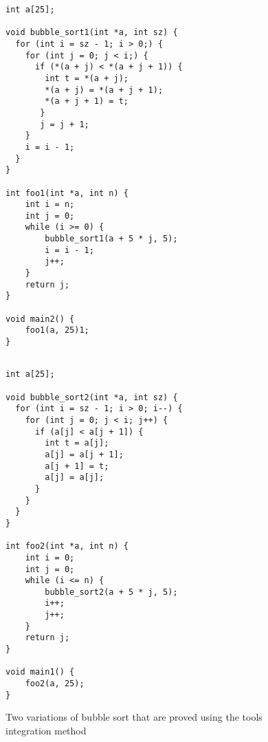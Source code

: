\begin{figure}[h]
\begin{center}
\begin{minipage}{8 cm}


\begin{lstlisting}
int a[25];

void bubble_sort1(int *a, int sz) {
  for (int i = sz - 1; i > 0;) {
    for (int j = 0; j < i;) {
      if (*(a + j) < *(a + j + 1)) {
        int t = *(a + j);
        *(a + j) = *(a + j + 1);
        *(a + j + 1) = t;
       }
       j = j + 1;
    }
    i = i - 1;
  }
}

int foo1(int *a, int n) {
    int i = n;
    int j = 0;
    while (i >= 0) {
        bubble_sort1(a + 5 * j, 5);
        i = i - 1;
        j++;
    }
    return j;
}

void main2() {
    foo1(a, 25)1;
}


\end{lstlisting}
\end{minipage}
\begin{minipage}{8 cm}
\begin{lstlisting}
int a[25];

void bubble_sort2(int *a, int sz) {
  for (int i = sz - 1; i > 0; i--) {
    for (int j = 0; j < i; j++) {
      if (a[j] < a[j + 1]) {
        int t = a[j];
        a[j] = a[j + 1];
        a[j + 1] = t;
        a[j] = a[j];
      }
    }
  }
}

int foo2(int *a, int n) {
    int i = 0;
    int j = 0;
    while (i <= n) {
        bubble_sort2(a + 5 * j, 5);
        i++;
        j++;
    }
    return j;
}

void main1() {
    foo2(a, 25);
}

\end{lstlisting}

\end{minipage}
\caption{Two variations of bubble sort that are proved using the tools integration method}
\label{fig:toolinteg}
\end{center}
\end{figure}

